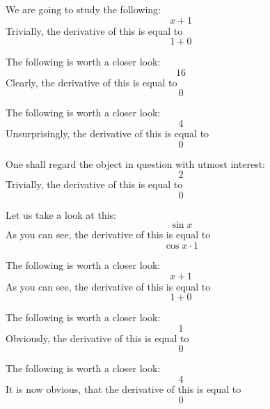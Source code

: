 \documentclass{article}
\begin{document}
We are going to study the following:
\begin{equation}
x + 1 
\end{equation}
Trivially, the derivative of this is equal to
\begin{equation}
1 + 0 
\end{equation}

The following is worth a closer look:
\begin{equation}
16 
\end{equation}
Clearly, the derivative of this is equal to
\begin{equation}
0 
\end{equation}

The following is worth a closer look:
\begin{equation}
4 
\end{equation}
Unsurprisingly, the derivative of this is equal to
\begin{equation}
0 
\end{equation}

One shall regard the object in question with utmost interest:
\begin{equation}
2 
\end{equation}
Trivially, the derivative of this is equal to
\begin{equation}
0 
\end{equation}

Let us take a look at this:
\begin{equation}
\sin x 
\end{equation}
As you can see, the derivative of this is equal to
\begin{equation}
\cos x \cdot 1 
\end{equation}

The following is worth a closer look:
\begin{equation}
x + 1 
\end{equation}
As you can see, the derivative of this is equal to
\begin{equation}
1 + 0 
\end{equation}

The following is worth a closer look:
\begin{equation}
1 
\end{equation}
Obviously, the derivative of this is equal to
\begin{equation}
0 
\end{equation}

The following is worth a closer look:
\begin{equation}
4 
\end{equation}
It is now obvious, that the derivative of this is equal to
\begin{equation}
0 
\end{equation}
\end{document}
